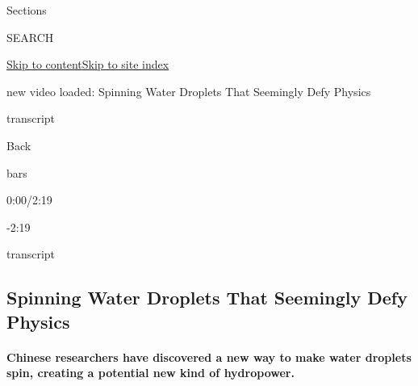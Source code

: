 Sections

SEARCH

\protect\hyperlink{site-content}{Skip to
content}\protect\hyperlink{site-index}{Skip to site index}

new video loaded: Spinning Water Droplets That Seemingly Defy Physics

transcript

Back

bars

0:00/2:19

-2:19

transcript

\hypertarget{spinning-water-droplets-that-seemingly-defy-physics}{%
\subsection{Spinning Water Droplets That Seemingly Defy
Physics}\label{spinning-water-droplets-that-seemingly-defy-physics}}

\hypertarget{chinese-researchers-have-discovered-a-new-way-to-make-water-droplets-spin-creating-a-potential-new-kind-of-hydropower}{%
\paragraph{Chinese researchers have discovered a new way to make water
droplets spin, creating a potential new kind of
hydropower.}\label{chinese-researchers-have-discovered-a-new-way-to-make-water-droplets-spin-creating-a-potential-new-kind-of-hydropower}}

